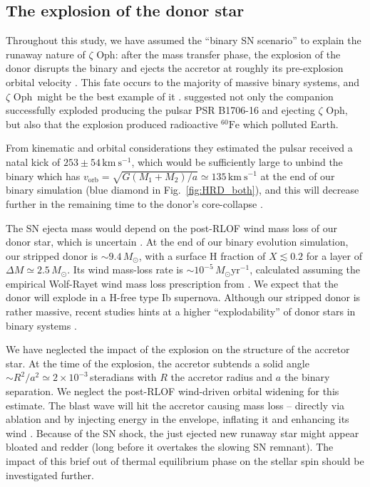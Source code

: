 \documentclass[twocolumn,twocolappendix,trackchanges]{aastex63}
\newcommand{\kms}{{\mathrm{km\ s^{-1}}}}
\DeclareRobustCommand{\Figref}[1]{Fig.~\ref{#1}}
\newcommand{\zoph}{$\zeta$ Oph}
\begin{document}
\subsection{The explosion of the donor star}
\label{sec:SN_comp}

Throughout this study, we have assumed the ``binary SN scenario'' to
explain the runaway nature of \zoph: after the mass transfer phase,
the explosion of the donor disrupts the binary and ejects the accretor
at roughly its pre-explosion orbital velocity
\citep[e.g.,][]{blaauw:61, eldridge:11, renzo:19walk}. This fate occurs to the
majority of massive binary systems, and \zoph\ might be the best
example of it \citep[e.g.,][]{blaauw:52, blaauw:61,
  hoogerwerf:00}. \cite{neuhauser:20} suggested not only the companion
successfully exploded producing the pulsar PSR B1706-16 and ejecting
\zoph, but also that the explosion produced radioactive
$^{60}\mathrm{Fe}$ which polluted Earth.

From kinematic and orbital considerations they estimated the pulsar
received a natal kick of $253\pm54\,\kms$, which would be sufficiently
large to unbind the binary which has
$v_\mathrm{orb}=\sqrt{G(M_1+M_2)/a}\simeq 135\,\kms$ at the end of our
binary simulation (blue diamond in \Figref{fig:HRD_both}), and this
will decrease further in the remaining time to the donor's
core-collapse \citep{kalogera:96, tauris:98, tauris:15}.

The SN ejecta mass would depend on the post-RLOF wind mass loss of our
donor star, which is uncertain \citep[see also][]{renzo:17, vink:17,
  gilkis:19, sander:20}. At the end of our binary evolution simulation, our
stripped donor is $\sim{}9.4\,M_\odot$, with a surface H fraction of
$X\lesssim0.2$ for a layer of $\Delta M \simeq 2.5\,M_\odot$.  Its
wind mass-loss rate is $\sim10^{-5}\,M_\odot \mathrm{yr^{-1}}$,
calculated assuming the empirical Wolf-Rayet wind mass loss
prescription from \citet[][see also \Figref{fig:MT}]{nugis:00}. We
expect that the donor will explode in a H-free type Ib
supernova. Although our stripped donor is rather massive, recent
studies hints at a higher ``explodability'' of donor stars in binary
systems \citep[e.g.,][]{schneider:21, laplace:21, vartanyan:21}.

We have neglected the impact of the explosion on the structure of the
accretor star. At the time of the explosion, the accretor subtends a
solid angle $\sim{}R^2/a^2\simeq 2\times10^{-3}$\,steradians with $R$
the accretor radius and $a$ the binary separation. We neglect the
post-RLOF wind-driven orbital widening for this estimate.  The blast
wave will hit the accretor causing mass loss -- directly via ablation
and by injecting energy in the envelope, inflating it and enhancing
its wind \citep{wheeler:75, tauris:98, podsiadlowski:03, hirai:18, ogata:21}.
Because of the SN shock, the just ejected new runaway star might
appear bloated and redder (long before it overtakes the slowing SN
remnant). The impact of this brief out of thermal equilibrium phase on
the stellar spin should be investigated further.
\end{document}
